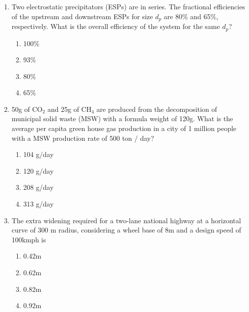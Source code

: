 \documentclass[journal]{IEEEtran}
\begin{document}
\begin{enumerate}
{        }
 	\item{
			Two electrostatic precipitators (ESPs) are in series. The fractional efficiencies of the upstream and downstream ESPs for size $d_p$ are 80\% and 65\%, respectively. What is the overall efficiency of the system for the same $d_p$?
			\hfill
			
			
			\begin{multicols}{4}
				\begin{enumerate}
					\item 100\%
					\item 93\%
					\item 80\%
					\item 65\%
				\end{enumerate}
			\end{multicols}
			
		}
 	\item{
			50g of CO$_2$ and 25g of CH$_4$ are produced from the decomposition of municipal solid waste (MSW) with a formula weight of 120g. What is the average per capita green house gas production in a city of 1 million people with a MSW production rate of 500 ton / day?\text{ }
			\hfill
			
			
			\begin{multicols}{2}
				\begin{enumerate}
					\item 104 g/day 
					\item 120 g/day 
					\item 208 g/day 
					\item 313 g/day 
				\end{enumerate}
			\end{multicols}
			
		}
    \item{
            The extra widening required for a two-lane national highway at a horizontal curve of 300 m radius, considering a wheel base of 8m and a design speed of 100kmph is\text{ }
             \hfill
                
            \begin{multicols}{4}
                \begin{enumerate}
                	\item 0.42m
                	\item 0.62m
                	\item 0.82m
                	\item 0.92m
                \end{enumerate}
            \end{multicols}

}
\end{enumerate}
\end{document}
